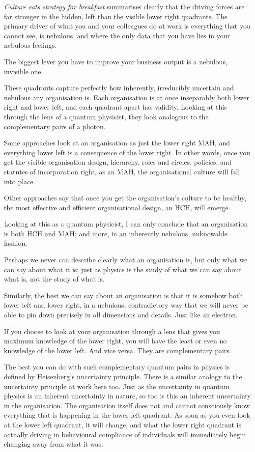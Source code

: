 \emph{Culture eats strategy for breakfast} summarises clearly that the driving forces are far stronger in the hidden, left than the visible lower right quadrants. The primary driver of what you and your colleagues do at work is everything that you cannot see, is nebulous, and where the only data that you have  lies in your nebulous feelings. 


The biggest lever you have to improve your business output is a nebulous, invisible one.


These quadrants capture perfectly how inherently, irreducibly uncertain and nebulous any organisation is. Each organisation is at once inseparably both lower right and lower left, and each quadrant apart has validity. Looking at this through the lens of a quantum physicist, they look analogous to the complementary pairs of a photon. 


Some approaches look at an organisation as just the lower right MAH, and everything lower left is a consequence of the lower right. In other words, once you get the visible organisation design, hierarchy, roles and circles, policies, and statutes of incorporation right, as an MAH, the organisational culture will fall into place.


Other approaches say that once you get the organisation's culture to be healthy, the most effective and efficient organisational design, an HCH, will emerge.


Looking at this as a quantum physicist, I can only conclude that an organisation is both HCH and MAH; and more, in an inherently nebulous, unknowable fashion. 


Perhaps we never can describe clearly what an organisation is, but only what we can say about what it is; just as physics is the study of what we can say about what is, not the study of what is.


Similarly, the best we can say about an organisation is that it is somehow both lower left and lower right, in a nebulous, contradictory way that we will never be able to pin down precisely in all dimensions and details. Just like an electron.


If you choose to look at your organisation through a lens that gives you maximum knowledge of the lower right, you will have the least or even no knowledge of the lower left. And vice versa. They are complementary pairs.


The best you can do with such complementary quantum pairs in physics is defined by Heisenberg’s  uncertainty principle. There is a similar analogy to the uncertainty principle at work here too. Just as the uncertainty in quantum physics is an inherent uncertainty in nature, so too is this an inherent uncertainty in the organisation. The organisation itself does not and cannot consciously know everything that is happening in the lower left quadrant. As soon as you even look at the lower left quadrant, it will change, and what the lower right quadrant is actually driving in behavioural compliance of individuals will immediately begin changing away from what it was.


